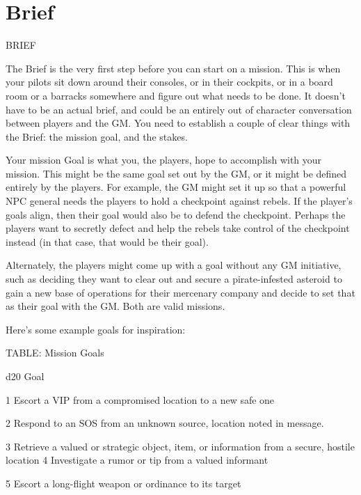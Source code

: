 \chapter{Brief}
                                                     BRIEF
 

The Brief is the very first step before you can start on a mission. This is when your pilots sit down  
around their consoles, or in their cockpits, or in a board room or a barracks somewhere and  
figure out what needs to be done. It doesn’t have to be an actual brief, and could be an entirely  
out of character conversation between players and the GM. You need to establish a couple of  
clear things with the Brief: the mission goal, and the stakes.
 

Your mission Goal is what you, the players, hope to accomplish with your mission. This might be  
the same goal set out by the GM, or it might be defined entirely by the players. For example, the  
GM might set it up so that a powerful NPC general needs the players to hold a checkpoint  
against rebels. If the player’s goals align, then their goal would also be to defend the checkpoint.  
Perhaps the players want to secretly defect and help the rebels take control of the checkpoint  
instead (in that case, that would be their goal).
 

Alternately, the players might come up with a goal without any GM initiative, such as deciding  
they want to clear out and secure a pirate-infested asteroid to gain a new base of operations for  
their mercenary company and decide to set that as their goal with the GM. Both are valid  
missions.
 

                                                                                                                 


Here’s some example goals for inspiration:
 

TABLE: Mission Goals
 

 d20       Goal 

 1         Escort a VIP from a compromised location to a new safe one 

 2         Respond to an SOS from an unknown source, location noted in message.  

 3         Retrieve a valued or strategic object, item, or information from a secure, hostile  
           location 
 4         Investigate a rumor or tip from a valued informant  

 5         Escort a long-flight weapon or ordinance to its target  

